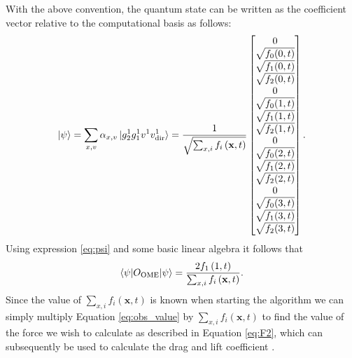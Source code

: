With the above convention, the quantum state can be written as the coefficient vector relative to the computational basis as follows: 
\begin{equation}\label{eq:psi}
    \ket{\psi} = \sum_{x,v} \alpha_{x,v} \ket{g^1_2g^1_1v^1v^1_\text{dir}} = \frac{1}{\sqrt{\sum_{x,i} f_i \left (\mathbf{x},t \right )}} \begin{bmatrix}
        0 \\
        \sqrt{f_0(0,t)} \\
        \sqrt{f_1(0,t)} \\
        \sqrt{f_2(0,t)} \\
        0 \\
        \sqrt{f_0(1,t)} \\
        \sqrt{f_1(1,t)} \\
        \sqrt{f_2(1,t)} \\
        0 \\
        \sqrt{f_0(2,t)} \\
        \sqrt{f_1(2,t)} \\
        \sqrt{f_2(2,t)} \\
        0 \\
        \sqrt{f_0(3,t)}  \\ 
        \sqrt{f_1(3,t)} \\
        \sqrt{f_2(3,t)}         
    \end{bmatrix}.
\end{equation}
Using expression \eqref{eq:psi} and some basic linear algebra it follows that
\begin{equation}\label{eq:obs_value}
    \braket{\psi|O_{\text{OME}}|\psi} = \frac{2f_1 \left ( 1, t \right )}{\sum_{x,i}f_i \left (\mathbf{x},t \right )} .
\end{equation}
Since the value of $\sum_{x,i}f_i \left (\mathbf{x},t \right )$ is known when starting the algorithm we can simply multiply Equation \eqref{eq:obs_value} by $\sum_{x,i}f_i \left (\mathbf{x},t \right )$ to find the value of the force we wish to calculate as described in Equation \eqref{eq:F2}, which can subsequently be used to calculate the drag and lift coefficient \cite{Ladd1994}. 

